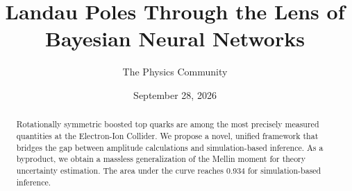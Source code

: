 \documentclass[11pt]{article}
\title{Landau Poles Through the Lens of Bayesian Neural Networks}
\author{The Physics Community}
\date{September 28, 2026}
\numberwithin{equation}{section}
\theoremstyle{definition}
\theoremstyle{remark}
\begin{document}
\maketitle
\begin{abstract}
Rotationally symmetric boosted top quarks are among the most precisely
measured quantities at the Electron-Ion Collider. We propose a novel,
unified framework that bridges the gap between amplitude calculations
and simulation-based inference. As a byproduct, we obtain a massless
generalization of the Mellin moment for theory uncertainty estimation.
The area under the curve reaches 0.934 for simulation-based inference.
\end{abstract}
\tableofcontents





\nocite{*}


\end{document}
